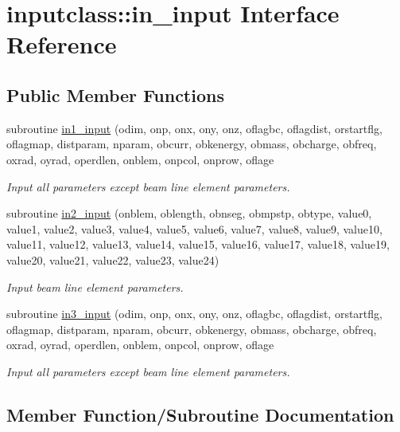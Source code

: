\hypertarget{interfaceinputclass_1_1in__input}{}\section{inputclass\+::in\+\_\+input Interface Reference}
\label{interfaceinputclass_1_1in__input}
\subsection*{Public Member Functions}
\begin{DoxyCompactItemize}
\item 
subroutine \mbox{\hyperlink{interfaceinputclass_1_1in__input_a040b73cd783eedcee270410a9461dc44}{in1\+\_\+input}} (odim, onp, onx, ony, onz, oflagbc, oflagdist, orstartflg, oflagmap, distparam, nparam, obcurr, obkenergy, obmass, obcharge, obfreq, oxrad, oyrad, operdlen, onblem, onpcol, onprow, oflage
\begin{DoxyCompactList}\small\item\em Input all parameters except beam line element parameters. \end{DoxyCompactList}\item 
subroutine \mbox{\hyperlink{interfaceinputclass_1_1in__input_a17f59236d66a719161eedf8fd9e0e842}{in2\+\_\+input}} (onblem, oblength, obnseg, obmpstp, obtype, value0, value1, value2, value3, value4, value5, value6, value7, value8, value9, value10, value11, value12, value13, value14, value15, value16, value17, value18, value19, value20, value21, value22, value23, value24)
\begin{DoxyCompactList}\small\item\em Input beam line element parameters. \end{DoxyCompactList}\item 
subroutine \mbox{\hyperlink{interfaceinputclass_1_1in__input_a63ed05a3bbf8218a4e904127e9c6c269}{in3\+\_\+input}} (odim, onp, onx, ony, onz, oflagbc, oflagdist, orstartflg, oflagmap, distparam, nparam, obcurr, obkenergy, obmass, obcharge, obfreq, oxrad, oyrad, operdlen, onblem, onpcol, onprow, oflage
\begin{DoxyCompactList}\small\item\em Input all parameters except beam line element parameters. \end{DoxyCompactList}\end{DoxyCompactItemize}


\subsection{Member Function/\+Subroutine Documentation}
\mbox{\label{interfaceinputclass_1_1in__input_a040b73cd783eedcee270410a9461dc44}} 
